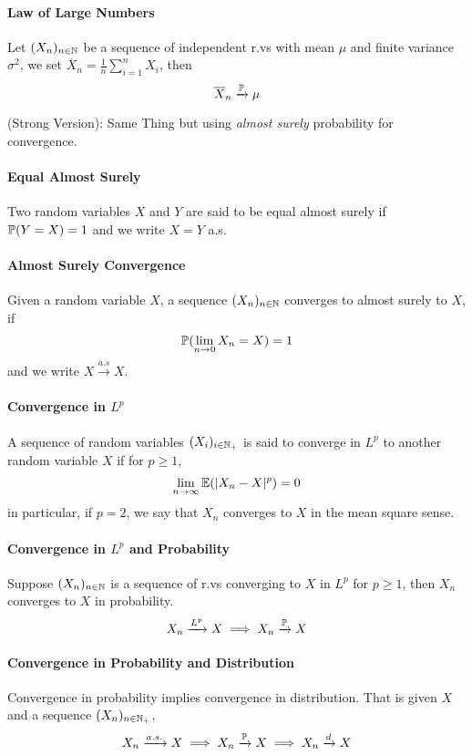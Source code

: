\paragraph{Law of Large Numbers}
Let \((X_n)_{n \in \mathbb{N}}\) be a sequence of independent r.vs with mean \(\mu\) and finite variance \(\sigma^2\), we set \(\overline{X}_n = \frac{1}{n}\sum_{i=1}^n X_i\), then
\[\overline{X}_n \xrightarrow{\mathbb{P}}\mu\]

(Strong Version): Same Thing but using \textit{almost surely} probability for convergence.

\paragraph{Equal Almost Surely}
Two random variables \(X\) and \(Y\) are said to be equal almost surely if \(\mathbb{P}(Y = X) = 1\) and we write \(X = Y\) a.s.

\paragraph{Almost Surely Convergence}
Given a random variable \(X\), a sequence \((X_n)_{n \in\mathbb{N}}\) converges to almost surely to \(X\), if
\[\mathbb{P}(\lim_{n\to 0} X_n = X) = 1\]
and we write \(X \xrightarrow{a.s} X\).

\paragraph{Convergence in \(L^p\)}
A sequence of random variables \((X_i)_{i \in \mathbb{N}_+}\) is said to converge in \(L^p\) to another random variable \(X\) if for \(p \geq 1\),
\[\lim_{n \to \infty} \mathbb{E}(|X_n - X|^p) = 0\]
in particular, if \(p = 2\), we say that \(X_n\) converges to \(X\) in the mean square sense.

\paragraph{Convergence in \(L^p\) and Probability}
Suppose \((X_n)_{n \in \mathbb{N}}\) is a sequence of r.vs converging to \(X\) in \(L^p\) for \(p \geq 1\), then \(X_n\) converges to \(X\) in probability.
\[X_n \xrightarrow{L^p} X \implies X_n \xrightarrow{\mathbb{P}} X\]

\paragraph{Convergence in Probability and Distribution}
Convergence in probability implies convergence in distribution. That is given \(X\) and a sequence \((X_n)_{n \in\mathbb{N}_+}\),
\[X_n \xrightarrow{a.s.} X \implies X_n \xrightarrow{\mathbb{P}} X \implies X_n \xrightarrow{d} X\]

